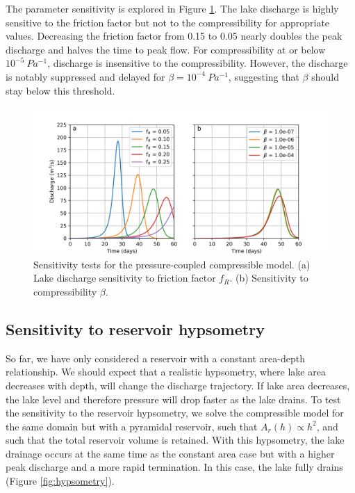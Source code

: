 \documentclass[11pt]{article}
\begin{document}
The parameter sensitivity is explored in Figure \ref{fig:sensitivity}. The lake discharge is highly sensitive to the friction factor but not to the compressibility for appropriate values. Decreasing the friction factor from 0.15 to 0.05 nearly doubles the peak discharge and halves the time to peak flow. For compressibility at or below $10^{-5}\SI{}{Pa^{-1}}$, discharge is insensitive to the compressibility. However, the discharge is notably suppressed and delayed for $\beta = 10^{-4}\SI{}{Pa^{-1}}$, suggesting that $\beta$ should stay below this threshold.

\begin{figure}[t]
\centering
\includegraphics[width=\textwidth]{sensitivity_tests.png}
\caption{Sensitivity tests for the pressure-coupled compressible model. (a) Lake discharge sensitivity to friction factor $f_R$. (b) Sensitivity to compressibility $\beta$.}
\label{fig:sensitivity}
\end{figure}

\subsection{Sensitivity to reservoir hypsometry}
So far, we have only considered a reservoir with a constant area-depth relationship. We should expect that a realistic hypsometry, where lake area decreases with depth, will change the discharge trajectory. If lake area decreases, the lake level and therefore pressure will drop faster as the lake drains. To test the sensitivity to the reservoir hypsometry, we solve the compressible model for the same domain but with a pyramidal reservoir, such that $A_r(h) \propto h^2$, and such that the total reservoir volume is retained. With this hypsometry, the lake drainage occurs at the same time as the constant area case but with a higher peak discharge and a more rapid termination. In this case, the lake fully drains (Figure \ref{fig:hypsometry}).
\end{document}

